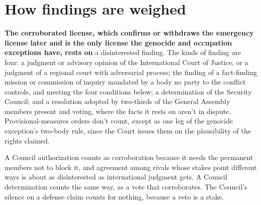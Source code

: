 \section{How findings are weighed}
\label{sec:F.1}
\textbf{The corroborated license, which confirms or withdraws the emergency license later and is the only license the genocide and occupation exceptions have, rests on} a disinterested finding. The kinds of finding are four: a judgment or advisory opinion of the International Court of Justice, or a judgment of a regional court with adversarial process; the finding of a fact-finding mission or commission of inquiry mandated by a body no party to the conflict controls, and meeting the four conditions below; a determination of the Security Council; and a resolution adopted by two-thirds of the General Assembly members present and voting, where the facts it rests on aren't in dispute. Provisional-measures orders don't count, except as one leg of the genocide exception's two-body rule, since the Court issues them on the plausibility of the rights claimed.

A Council authorization counts as corroboration because it needs the permanent members not to block it, and agreement among rivals whose stakes point different ways is about as disinterested as international judgment gets. A Council determination counts the same way, as a vote that corroborates. The Council's silence on a defense claim counts for nothing, because a veto is a stake.

